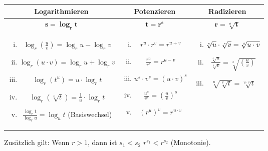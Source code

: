 \begin{center}
\begin{tabular}{c|c|c}
Logarithmieren & Potenzieren & Radizieren\\
\hline
$\mathbf{s = \log_r t}$ & $\mathbf{t = r^s}$ &
\phantom{$\left(\frac{\frac{c}{d}a}{b}\right)$} $\mathbf{r = \sqrt[\mathbf{s}]{\mathbf{t}}}$\\
\hline
\begin{minipage}[t]{0.38\textwidth}
\begin{enumerate}[i)]
%
\item $\log_r (\frac{u}{v}) = \log_r u - \log_r v$
%
\item $\log_r ({u} \cdot {v}) = \log_r u + \log_r v$
%
\item $\log_r (t^u) = u \cdot \log_r t$
%
\item $\log_r (\sqrt[u]{t}) = \frac{1}{u} \cdot \log_r t$
%
\item $\frac{\log_r t}{\log_r u} = \log_u t$ (Basiswechsel)
%
\end{enumerate}
\end{minipage}
&
\begin{minipage}[t]{0.25\textwidth}
\begin{enumerate}[i)]
%
\item $r^{u} \cdot r^{v} = r^{u + v}$
%
\item $\frac{r^{u}}{r^{v}} = r^{u - v}$
%
\item $u^{s} \cdot v^{s} = (u \cdot v)^{s}$
%
\item $\frac{u^{s}}{v^{s}} = \left(\frac{u}{v}\right)^{s}$
%
\item $(r^{u})^{v} = r^{u \cdot v}$ 
%
\end{enumerate}
\end{minipage}
&
\begin{minipage}[t]{0.28\textwidth}
%
\begin{enumerate}[i)]
%
\item $\sqrt[\leftroot{1} s]{u} \cdot \sqrt[s]{v} = \sqrt[s]{u \cdot v}$
%
\item $\frac{\sqrt[s]{u}}{\sqrt[s]{v}} = \sqrt[s]{\left(\frac{u}{v}\right)}$
%
\item $\sqrt[u]{\sqrt[v]{t}} =
  \sqrt[u \cdot v]{t}$
%
\end{enumerate}
\end{minipage}\\
\end{tabular}
\end{center}
Zusätzlich gilt: Wenn $r > 1$, dann ist $s_1 < s_2$ \gdw $r^{s_1} <
r^{s_2}$ (Monotonie).

